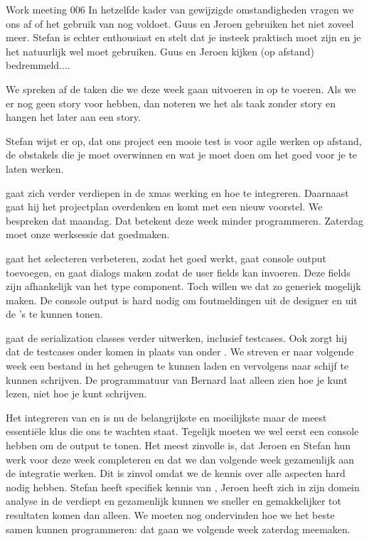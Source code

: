 \documentclass[a4paper,final]{article}
\begin{document}
\begin{Minutes}{Work meeting 006}
 In hetzelfde kader van gewijzigde omstandigheden vragen we ons af 
of het gebruik van \agilefant nog voldoet. Guus en Jeroen gebruiken het niet zoveel meer. Stefan
is echter enthousiast en stelt dat je insteek praktisch moet zijn en je het natuurlijk wel moet
gebruiken. Guus en Jeroen kijken (op afstand) bedremmeld....

We spreken af de taken die we deze week gaan uitvoeren in \agilefant op te voeren. Als we er nog
geen story voor hebben, dan noteren we het als taak zonder story en hangen het later aan een story.

Stefan wijst er op, dat ons project een mooie test is voor agile werken op afstand, de obstakels
die je moet overwinnen en wat je moet doen om het goed voor je te laten werken.


 gaat zich verder verdiepen in de xmas werking en hoe te integreren. Daarnaast
gaat hij het projectplan overdenken en komt met een nieuw voorstel. We bespreken dat maandag. Dat
betekent deze week minder programmeren. Zaterdag moet onze werksessie dat goedmaken.

 gaat het selecteren verbeteren, zodat het goed werkt, gaat console output
toevoegen, en gaat dialogs maken zodat de user fields kan invoeren. Deze fields zijn
afhankelijk van het type component. Toch willen we dat zo generiek mogelijk maken. De
console output is hard nodig om foutmeldingen uit de designer en uit de \vt's te kunnen 
tonen.

 gaat de serialization classes verder uitwerken, inclusief testcases. Ook zorgt hij
dat de testcases onder \xmvtest komen in plaats van onder \xmv. We streven er naar
volgende week een bestand in het geheugen te kunnen laden en vervolgens naar schijf te kunnen
schrijven. De programmatuur van Bernard laat alleen zien hoe je kunt lezen, niet hoe je
kunt schrijven.

 Het integreren van \xmv en \xmd is nu de belangrijkste en moeilijkste maar 
de meest essenti\"{e}le klus die ons te wachten staat. Tegelijk moeten we wel eerst een console hebben
om de output te tonen. Het meest zinvolle is, dat Jeroen en Stefan hun werk voor deze week completeren
en dat we dan volgende week gezamenlijk aan de integratie werken. Dit is zinvol omdat we de kennis over 
alle aspecten hard nodig hebben. Stefan heeft specifiek kennis van \qml, Jeroen heeft zich in zijn
domein analyse in de  verdiept en gezamenlijk kunnen we sneller en gemakkelijker tot resultaten
komen dan alleen. We moeten nog ondervinden hoe we het beste samen kunnen programmeren: dat gaan we 
volgende week zaterdag meemaken.


\end{Minutes}
\end{document}
